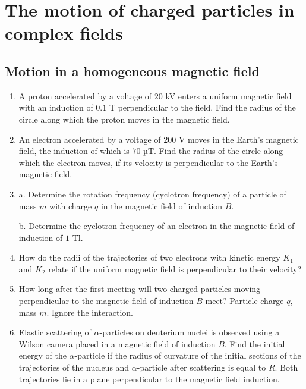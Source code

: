 \documentclass{article}
\begin{document}
\section{The motion of charged particles in complex fields}
\subsection{Motion in a homogeneous magnetic field}

\begin{enumerate}[label=10.1.\arabic*]


\item A proton accelerated by a voltage of $20$ kV enters a uniform magnetic field with an induction of $0.1$ T perpendicular to the field. Find the radius of the circle along which the proton moves in the magnetic field.

\item An electron accelerated by a voltage of $200$ V moves in the Earth's magnetic field, the induction of which is $70$ µT. Find the radius of the circle along which the electron moves, if its velocity is perpendicular to the Earth's magnetic field.

\item a. Determine the rotation frequency (cyclotron frequency) of a particle of mass $m$ with charge $q$ in the magnetic field of induction $B$. 

b. Determine the cyclotron frequency of an electron in the magnetic field of induction of $1$ Tl.

\item How do the radii of the trajectories of two electrons with kinetic energy $K_1$ and $K_2$ relate if the uniform magnetic field is perpendicular to their velocity?

\item How long after the first meeting will two charged particles moving perpendicular to the magnetic field of induction $B$ meet? Particle charge $q$, mass $m$. Ignore the interaction.

\item Elastic scattering of $\alpha$-particles on deuterium nuclei is observed using a Wilson camera placed in a magnetic field of induction $B$. Find the initial energy of the $\alpha$-particle if the radius of curvature of the initial sections of the trajectories of the nucleus and $\alpha$-particle after scattering is equal to $R$. Both trajectories lie in a plane perpendicular to the magnetic field induction.


\end{enumerate}
\end{document}
